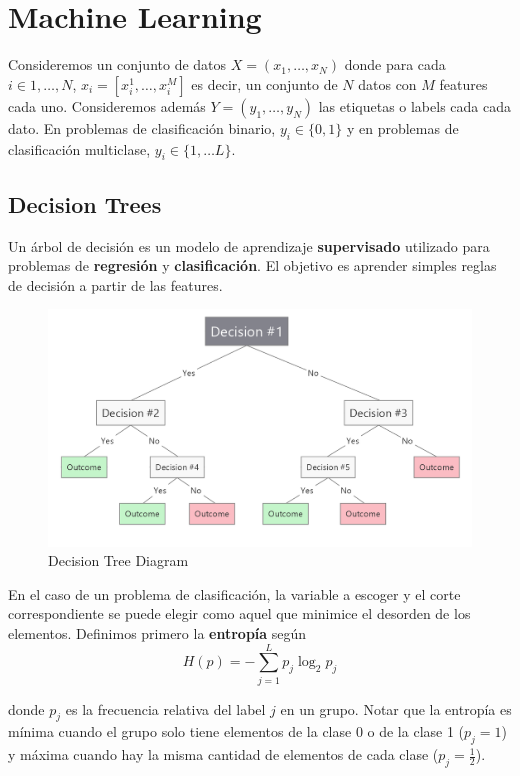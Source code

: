 \section{Machine Learning}

Consideremos un conjunto de datos $X = (x_1, \dots , x_N)$ donde para cada $i \in {1, \dots, N}$, $x_i = [x_{i}^1 , \dots, x_{i}^M]$ es decir, un conjunto de $N$ datos con $M$ features cada uno. Consideremos además $Y = (y_1, \dots , y_N)$ las etiquetas o labels cada cada dato. En problemas de clasificación binario, $y_i \in \{ 0, 1\}$ y en problemas de clasificación multiclase, $y_i \in \{1, \dots L\}$.

\subsection{Decision Trees}

Un árbol de decisión es un modelo de aprendizaje \textbf{supervisado} utilizado para problemas de \textbf{regresión} y \textbf{clasificación}. El objetivo es aprender simples reglas de decisión a partir de las features. 

\begin{figure}[H]
    \center
    \includegraphics[scale=0.25]{notebooks/ML/img/decision_tree_diagram.png}
    \caption{Decision Tree Diagram}
\end{figure}

En el caso de un problema de clasificación, la variable a escoger y el corte correspondiente se puede elegir como aquel que minimice el desorden de los elementos. Definimos primero la \textbf{entropía} según 
$$H(p) = - \sum_{j=1}^{L}p_j\log_{2}p_j$$

donde $p_j$ es la frecuencia relativa del label $j$ en un grupo. Notar que la entropía es mínima cuando el grupo solo tiene elementos de la clase 0 o de la clase 1 ($p_j = 1$) y máxima cuando hay la misma cantidad de elementos de cada clase ($p_j = \frac{1}{2}$). 


